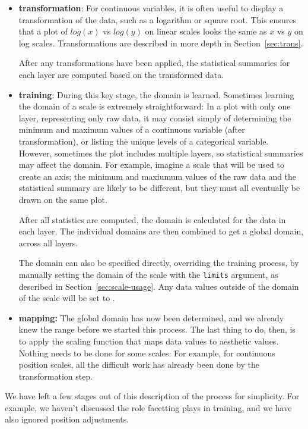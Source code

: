 \begin{itemize}
\item
{\bf transformation}: For continuous variables, it is often useful to display a transformation of the data, such as a logarithm or square root.  This ensures that a plot of $log(x)$ vs $log(y)$ on linear scales looks the same as $x$ vs $y$ on log scales.  Transformations are described in more depth in Section~\ref{sec:trans}.

After any transformations have been applied, the statistical summaries for each layer are computed based on the transformed data.
\item
{\bf training}:  During this key stage, the domain is learned.  Sometimes learning the domain of a scale is extremely straightforward: In a plot with only one layer, representing only raw data, it may consist simply of determining the minimum and maximum values of a continuous variable (after transformation), or listing the unique levels of a categorical variable.  However,  sometimes the plot includes multiple layers, so statistical summaries may affect the domain.  For example, imagine a scale that will be used to create an axis; the minimum and maxiumum values of the raw data and the statistical summary are likely to be different, but they must all eventually be drawn on the same plot.

After all statistics are computed, the domain is calculated for the data in each layer.  The individual domains are then combined to get a global domain, across all layers. 

The domain can also be specified directly, overriding the training process, by manually setting the domain of the scale with the {\tt limits} argument, as described in Section~\ref{sec:scale-usage}.  Any data values outside of the domain of the scale will be set to .
\item
{\bf mapping:}  The global domain has now been determined, and we already knew the range before we started this process.  The last thing to do, then, is to apply the scaling function that maps data values to aesthetic values.  Nothing needs to be done for some scales: For example, for continuous position scales, all the difficult work has already been done by the transformation step.
	
\end{itemize}

We have left a few stages out of this description of the process for simplicity.  For example, we haven't discussed the role facetting plays in training, and we have also ignored position adjustments.


